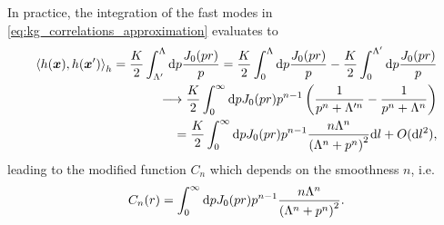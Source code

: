 In practice, the integration of the fast modes in \cref{eq:kg_correlations_approximation} evaluates to
\begin{align}
    \braket{h({\bm x}),h(\bm x')}_h = \frac K2\int_{\Lambda'}^\Lambda\mathrm d p\frac{J_0(p r)}{p} = \frac K2\int_{0}^\Lambda\mathrm d p\frac{J_0(p r)}{p}
    -\frac K2\int_{0}^{\Lambda'}\mathrm d p\frac{J_0(p r)}{p}
    \\
    \longrightarrow
    \frac K2\int_{0}^\infty\mathrm d p J_0(p r)p^{n-1}\left( \frac1{p^n+\Lambda'^n}-\frac1{p^n+\Lambda^n} \right)
    \\
    =
    \frac K2\int_{0}^\infty\mathrm d p J_0(p r)p^{n-1}\frac{n\Lambda^n}{\left(\Lambda^n+p^n\right)^2}\mathrm d l + O(\mathrm d l^2),
    \label{eq:rg_hxhxpr}
\end{align}
leading to the modified function $C_n$ which depends on the smoothness $n$, i.e.
\begin{align}
    C_n(r)
    =
    \int_{0}^\infty\mathrm d p J_0(p r)p^{n-1}\frac{n\Lambda^n}{\left(\Lambda^n+p^n\right)^2}.
    \label{eq:rg_cn_def}
\end{align}
